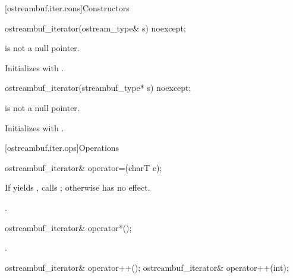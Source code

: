 [ostreambuf.iter.cons]{Constructors}

\begin{indexed}{}
\begin{itemdecl}
ostreambuf_iterator(ostream_type& s) noexcept;
\end{itemdecl}
\end{indexed}

\begin{itemdescr}
\pnum
\expects
{}
is not a null pointer.

\pnum
\effects
Initializes  with .
\end{itemdescr}

\begin{indexed}{}
\begin{itemdecl}
ostreambuf_iterator(streambuf_type* s) noexcept;
\end{itemdecl}
\end{indexed}

\begin{itemdescr}
\pnum
\expects
{}
is not a null pointer.

\pnum
\effects
Initializes  with .
\end{itemdescr}

[ostreambuf.iter.ops]{Operations}

%
\begin{itemdecl}
ostreambuf_iterator& operator=(charT c);
\end{itemdecl}

\begin{itemdescr}
\pnum
\effects
If
yields
,
calls
;
otherwise has no effect.

\pnum
\returns
{}.
\end{itemdescr}

%
\begin{itemdecl}
ostreambuf_iterator& operator*();
\end{itemdecl}

\begin{itemdescr}
\pnum
\returns
{}.
\end{itemdescr}

%
\begin{itemdecl}
ostreambuf_iterator& operator++();
ostreambuf_iterator& operator++(int);
\end{itemdecl}


